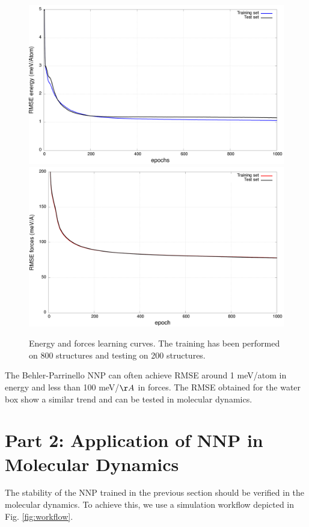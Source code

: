\documentclass[12pt]{article}
\begin{document}
\begin{figure}
    \centering
    \includegraphics[scale=0.2]{latex_files/energy.png}
    \includegraphics[scale=0.2]{latex_files/forces.png}
    \caption{Energy and forces learning curves. The training has been performed on 800 structures and testing on 200 structures.}
    \label{fig:my_label}
\end{figure}

The Behler-Parrinello NNP can often achieve RMSE around 1 meV/atom in energy and less than 100 meV/$\AA$ in forces. The RMSE obtained for the water box show a similar trend and can be tested in molecular dynamics.

\newpage
{}
\section{Part 2: Application of NNP in Molecular Dynamics}
The stability of the NNP trained in the previous section should be verified in the molecular dynamics. To achieve this, we use a simulation workflow depicted in Fig. \ref{fig:workflow}. 
\end{document}
